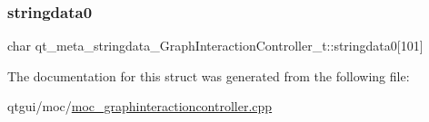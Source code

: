 \subsubsection{\texorpdfstring{stringdata0}{stringdata0}}
{\footnotesize\ttfamily char qt\+\_\+meta\+\_\+stringdata\+\_\+\+Graph\+Interaction\+Controller\+\_\+t\+::stringdata0\mbox{[}101\mbox{]}}



The documentation for this struct was generated from the following file\+:\begin{DoxyCompactItemize}
\item 
qtgui/moc/\mbox{\hyperlink{moc__graphinteractioncontroller_8cpp}{moc\+\_\+graphinteractioncontroller.\+cpp}}\end{DoxyCompactItemize}
